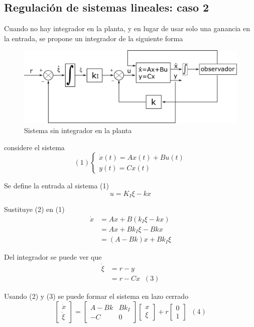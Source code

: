 \subsection{Regulación de sistemas lineales: caso 2}

Cuando no hay integrador en la planta, y en lugar de usar solo una ganancia en la entrada, se propone un integrador de la siguiente forma

\begin{figure}[h!]
    \centering
        \includegraphics[scale=0.18]{Control de Sistemas Mecatronicos Figuras/15 Sin Integrador en la Planta.png}
        \caption{Sistema sin integrador en la planta}
\end{figure}

considere el sistema 
\[(1)
    \left\{
        \begin{array}{lll}
            \dot{x}(t) = Ax(t) + Bu(t) \\
            y(t) = Cx(t)
        \end{array}
    \right.
\]

Se define la entrada al sistema (1)
\[
    u = K_{I}\xi - kx
\]

Sustituye (2) en (1)
\[
    \begin{split}
        \dot{x} & = Ax + B(k_{I}\xi - kx) \\
        & = Ax + Bk_{I}\xi - Bkx \\
        & = (A-Bk)x + Bk_{I}\xi
    \end{split}
\]

Del integrador se puede ver que
\[
    \begin{split}
       \dot{\xi} & = r - y \\
       & = r - Cx \;\; (3) 
    \end{split}
\]

Usando (2) y (3) se puede formar el sistema en lazo cerrado
\[
    \begin{bmatrix}
        \dot{x} \\ \dot{\xi}
    \end{bmatrix} = 
    \begin{bmatrix}
        A-Bk & Bk_{I} \\
        -C & 0
    \end{bmatrix}
    \begin{bmatrix}
        x \\ \xi
    \end{bmatrix} + r
    \begin{bmatrix}
        0 \\ 1
    \end{bmatrix} \;\; (4)
\]

